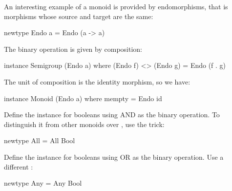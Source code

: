 \documentclass[DaoFP]{subfiles}
\begin{document}
An interesting example of a monoid is provided by endomorphisms, that is morphisms whose source and target are the same:
\begin{haskell}
newtype Endo a = Endo (a -> a)
\end{haskell}
The binary operation is given by composition:
\begin{haskell}
instance Semigroup (Endo a) where
  (Endo f) <> (Endo g) = Endo (f . g)
\end{haskell}
The unit of composition is the identity morphism, so we have:
\begin{haskell}
instance Monoid (Endo a) where
  mempty = Endo id
\end{haskell}

\begin{exercise}
Define the  instance for booleans using AND as the binary operation. To distinguish it from other monoids over , use the  trick:
\begin{haskell}
newtype All = All Bool
\end{haskell}
\end{exercise}

\begin{exercise}
Define the  instance for booleans using OR as the binary operation. Use a different  :
\begin{haskell}
newtype Any = Any Bool
\end{haskell}
\end{exercise}
\end{document}
